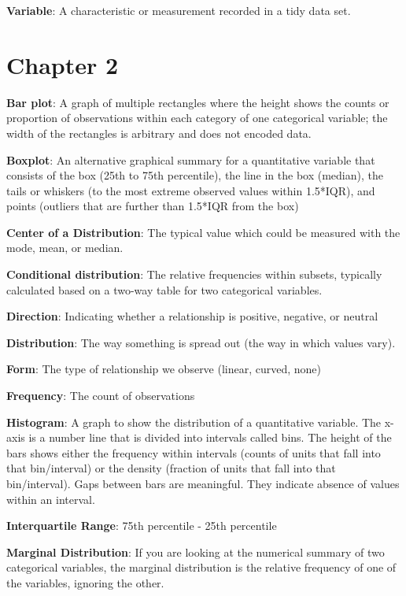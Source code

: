 \documentclass[
]{book}
\begin{document}
\textbf{Variable}: A characteristic or measurement recorded in a tidy data set.

\hypertarget{chapter-2}{%
\section{Chapter 2}\label{chapter-2}}

\textbf{Bar plot}: A graph of multiple rectangles where the height shows the counts or proportion of observations within each category of one categorical variable; the width of the rectangles is arbitrary and does not encoded data.

\textbf{Boxplot}: An alternative graphical summary for a quantitative variable that consists of the box (25th to 75th percentile), the line in the box (median), the tails or whiskers (to the most extreme observed values within 1.5*IQR), and points (outliers that are further than 1.5*IQR from the box)

\textbf{Center of a Distribution}: The typical value which could be measured with the mode, mean, or median.

\textbf{Conditional distribution}: The relative frequencies within subsets, typically calculated based on a two-way table for two categorical variables.

\textbf{Direction}: Indicating whether a relationship is positive, negative, or neutral

\textbf{Distribution}: The way something is spread out (the way in which values vary).

\textbf{Form}: The type of relationship we observe (linear, curved, none)

\textbf{Frequency}: The count of observations

\textbf{Histogram}: A graph to show the distribution of a quantitative variable. The x-axis is a number line that is divided into intervals called bins. The height of the bars shows either the frequency within intervals (counts of units that fall into that bin/interval) or the density (fraction of units that fall into that bin/interval). Gaps between bars are meaningful. They indicate absence of values within an interval.

\textbf{Interquartile Range}: 75th percentile - 25th percentile

\textbf{Marginal Distribution}: If you are looking at the numerical summary of two categorical variables, the marginal distribution is the relative frequency of one of the variables, ignoring the other.
\end{document}
